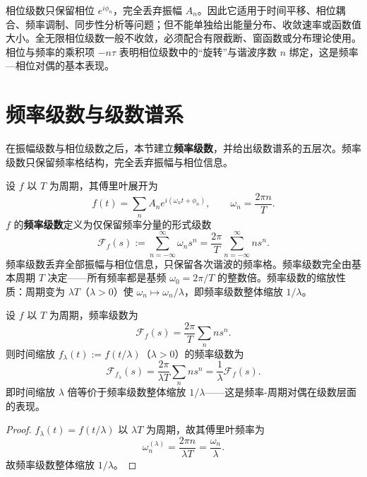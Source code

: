\begin{remark}[相位级数的适用范围与注意事项]\label{rem:phase_series_scope}
相位级数只保留相位 $e^{i\phi_n}$，完全丢弃振幅 $A_n$。因此它适用于时间平移、相位耦合、频率调制、同步性分析等问题；但不能单独给出能量分布、收敛速率或函数值大小。全无限相位级数一般不收敛，必须配合有限截断、窗函数或分布理论使用。相位与频率的乘积项 $-n\tau$ 表明相位级数中的“旋转”与谐波序数 $n$ 绑定，这是频率—相位对偶的基本表现。
\end{remark}

\section{\texorpdfstring{频率级数与级数谱系}{频率级数与级数谱系}}

在振幅级数与相位级数之后，本节建立\textbf{频率级数}，并给出级数谱系的五层次。频率级数只保留频率格结构，完全丢弃振幅与相位信息。

\begin{definition}[频率级数]\label{def:frequency_series}
设 $f$ 以 $T$ 为周期，其傅里叶展开为
\[
f(t)=\sum_{n} A_n e^{i(\omega_n t+\phi_n)}, \qquad \omega_n=\frac{2\pi n}{T}.
\]
$f$ 的\textbf{频率级数}定义为仅保留频率分量的形式级数
\[
\mathcal{F}_f(s) := \sum_{n=-\infty}^{\infty} \omega_n s^n
= \frac{2\pi}{T}\sum_{n=-\infty}^{\infty} n s^n.
\]
频率级数丢弃全部振幅与相位信息，只保留各次谐波的频率格。频率级数完全由基本周期 $T$ 决定——所有频率都是基频 $\omega_0=2\pi/T$ 的整数倍。频率级数的缩放性质：周期变为 $\lambda T$（$\lambda>0$）使 $\omega_n\mapsto \omega_n/\lambda$，即频率级数整体缩放 $1/\lambda$。
\end{definition}

\begin{proposition}[频率级数与周期缩放]\label{prop:frequency_scaling}
设 $f$ 以 $T$ 为周期，频率级数为
\[
\mathcal{F}_f(s)=\frac{2\pi}{T}\sum_n n s^n.
\]
则时间缩放 $f_\lambda(t):=f(t/\lambda)$（$\lambda>0$）的频率级数为
\[
\mathcal{F}_{f_\lambda}(s)
= \frac{2\pi}{\lambda T}\sum_n n s^n
= \frac{1}{\lambda}\mathcal{F}_f(s).
\]
即时间缩放 $\lambda$ 倍等价于频率级数整体缩放 $1/\lambda$——这是频率-周期对偶在级数层面的表现。
\end{proposition}

\begin{proof}
$f_\lambda(t)=f(t/\lambda)$ 以 $\lambda T$ 为周期，故其傅里叶频率为
\[
\omega_n^{(\lambda)}=\frac{2\pi n}{\lambda T}=\frac{\omega_n}{\lambda}.
\]
故频率级数整体缩放 $1/\lambda$。
\end{proof}

